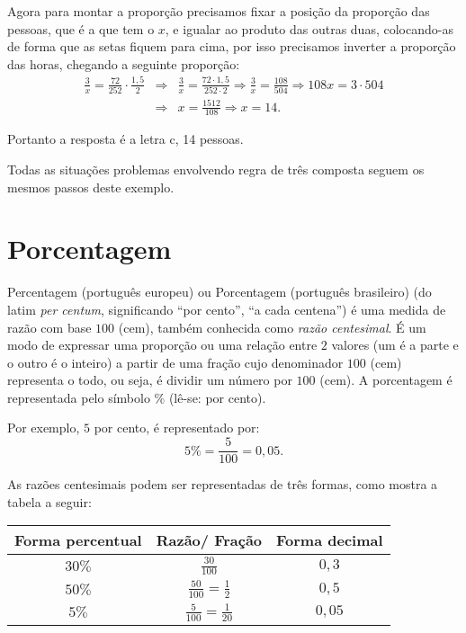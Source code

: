 \begin{exem}
  Agora para montar a proporção precisamos fixar a posição da proporção das pessoas, que é a que tem o $x$, e igualar ao produto das outras duas, colocando-as de forma que as setas fiquem para cima, por isso precisamos inverter a proporção das horas, chegando a seguinte proporção:
  \begin{eqnarray}
    \frac{3}{x}= \frac{72}{252} \cdot \frac{1,5}{2} & \Rightarrow & \frac{3}{x}=\frac{72\cdot 1,5}{252 \cdot 2} \Rightarrow \frac{3}{x}=\frac{108}{504} \Rightarrow 108 x= 3 \cdot 504\\
    & \Rightarrow &x=\frac{1512}{108} \Rightarrow x=14.
  \end{eqnarray}

  Portanto a resposta é a letra c, 14 pessoas.
  \fim
\end{exem}

Todas as situações problemas envolvendo regra de três composta seguem os mesmos passos deste exemplo.


\chapter{Porcentagem}

Percentagem (português europeu) ou Porcentagem (português brasileiro) (do latim \textit{per centum}, significando ``por cento'', ``a cada centena'') é uma medida de razão com base $100$ (cem), também conhecida como \textit{razão centesimal}. É um modo de expressar uma proporção ou uma relação entre $2$ valores (um é a parte e o outro é o inteiro) a partir de uma fração cujo denominador $100$ (cem) representa o todo, ou seja, é dividir um número por $100$ (cem). A porcentagem é representada pelo símbolo $\%$ (lê-se: por cento).

Por exemplo, $5$ por cento, é representado por:
\begin{equation}
 5\%= \frac{5}{100}= 0,05 .
\end{equation}

As razões centesimais podem ser representadas de três formas, como mostra a tabela a seguir:

\begin{table}[h]
\centering
 \begin{tabular}{|c|c|c|} \hline
  {\textbf{Forma percentual}} & {\textbf{Razão/ Fração}} & \textbf{Forma decimal} \\ \hline
 $30\%$ & $\frac{30}{100}$ & $0,3$ \\\hline
 $50\%$ & $\frac{50}{100} = \frac{1}{2}$ & $0,5$ \\\hline
 $5\%$ & $\frac{5}{100}=\frac{1}{20}$ & $0,05$ \\\hline
 \end{tabular}
\end{table}

